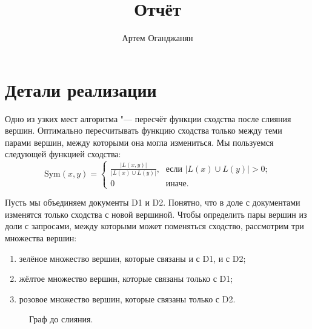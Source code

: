 \documentclass{article}
\title{Отчёт}
\author{Артем Оганджанян}
\date{}
\begin{document}
\usetikzlibrary{arrows.meta,positioning,matrix}

\maketitle

\section{\texorpdfstring{Детали реализации}{Implementation details}}
Одно из узких мест алгоритма "--- пересчёт функции сходства после слияния вершин.
Оптимально пересчитывать функцию сходства только между теми парами вершин, между которыми она могла измениться.
Мы пользуемся следующей функцией сходства:
\[
    \mathrm{Sym}(x, y) = \begin{cases}
        \frac{\displaystyle \left|L(x, y)\right|}{\displaystyle \left|L(x) \cup L(y)\right|}\text{,} &
                \text{если }\left|L(x) \cup L(y)\right| > 0\text{;} \\
        0 & \text{иначе.}
    \end{cases}
\]

Пусть мы объединяем документы D1 и D2.
Понятно, что в доле с документами изменятся только сходства с новой вершиной.
Чтобы определить пары вершин из доли с запросами, между которыми может поменяться сходство,
рассмотрим три множества вершин:
\begin{enumerate}
    \item зелёное множество вершин, которые связаны и с D1, и с D2;
    \item жёлтое множество вершин, которые связаны только с D1;
    \item розовое множество вершин, которые связаны только с D2.
\end{enumerate}

\begin{figure}[h]
    \centering
    \caption{Граф до слияния.}
    \label{diagram}
\end{figure}
\end{document}
